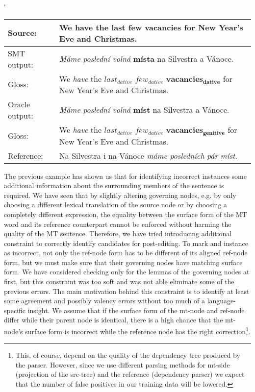 \begin{myexample}
    \small
    \catcode`
    \begin{center}
    \begin{tabular}{|l|p{}|}
    \hline
    \textbf{Source:}  &  \textbf{We have the last few vacancies for New Year's Eve and Christmas.}  \\
    \hline
    SMT output:  &  \textit{Máme} \textit{poslední} \textit{volná} \textbf{místa} na Silvestra a Vánoce.  \\
    \hline
    Gloss:  &  We \textit{have} the $\mathit{last_{dative}}$ $\mathit{few_{dative}}$ $\mathbf{vacancies_{dative}}$ for New Year's Eve and Christmas.  \\
    \hline
    Oracle output:  &  \textit{Máme} \textit{poslední} \textit{volná} \textbf{míst} na Silvestra a Vánoce.  \\
    \hline
    Gloss:  &  We \textit{have} the $\mathit{last_{dative}}$ $\mathit{few_{dative}}$ $\mathbf{vacancies_{genitive}}$ for New Year's Eve and Christmas.  \\
    \hline
    Reference:  &  Na Silvestra i na Vánoce \textit{máme} \textit{posledních} \textit{pár} \textit{míst}.  \\
    \hline
    \end{tabular}
    \label{ex-oracle-noref}
    \end{center}
\end{myexample}

The previous example has shown us that for identifying incorrect instances some additional information
about the surrounding members of the sentence is required.
We have seen that by slightly altering governing nodes, e.g.
by only choosing a different lexical translation of the source node or by choosing a completely different expression,
the equality between the surface form of the MT word and its reference counterpart cannot
be enforced without harming the quality of the MT sentence.
Therefore, we have tried introducing additional constraint to correctly identify candidates for post-editing.
To mark and instance as incorrect, not only the ref-node form has to be different of its aligned
ref-node form, but we must make sure that their governing nodes have matching surface form.
We have considered checking only for the lemmas of the governing nodes at first, but this constraint
was too soft and was not able eliminate some of the previous errors.
The main motivation behind this constraint is to identify at least some agreement and possibly valency errors
without too much of a language-specific insight. We assume that if the surface form of the mt-node and ref-node
differ while their parent node is identical, there is a high chance that the mt-node's surface form is
incorrect while the reference node has the right correction\footnote{This, of course, depend on the quality of the dependency
tree produced by the parser. However, since we use different parsing methods for mt-side (projection of the src-tree) and
the reference (dependency parser) we expect that the number of false positives in our training data will be lowered.}.


